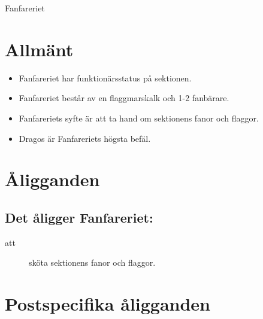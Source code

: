 \documentclass[a4paper]{article}
\begin{document}
\renewcommand{\forening}{Fanfareriet} %

\begin{foreningenv}{\forening{}} %
    \section{Allmänt}
    \begin{itemize}
        \item Fanfareriet har funktionärsstatus på sektionen.
        \item Fanfareriet består av en flaggmarskalk och 1-2 fanbärare.
        \item Fanfareriets syfte är att ta hand om sektionens fanor och flaggor.
        \item Dragos är Fanfareriets högsta befäl.
    \end{itemize}
    
    \section{Åligganden}
    \aliggsektfunkt{}
    
    \subsection{Det åligger Fanfareriet:}
    \begin{description}
        \item[att] sköta sektionens fanor och flaggor.
    \end{description}
    
    \section{Postspecifika åligganden}

\end{foreningenv}
\end{document}
